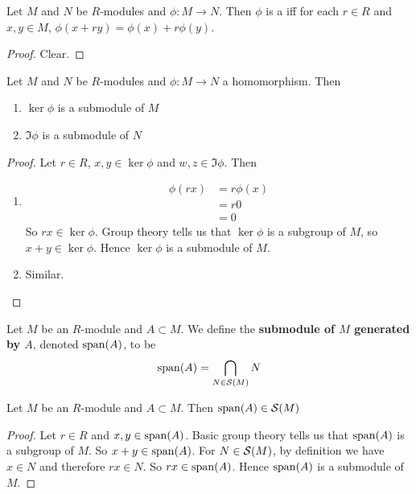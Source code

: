 \documentclass{book}
\begin{document}
	\begin{ex}
		Let $M$ and $N$ be $R$-modules and $\phi:M \rightarrow N$. Then $\phi$ is a  iff for each $r \in R$ and $x,y \in M$, $\phi(x+ry) = \phi(x) + r \phi(y)$.
	\end{ex}
	
	\begin{proof}
		Clear.
	\end{proof}
	
	\begin{ex}
		Let $M$ and $N$ be $R$-modules and $\phi:M \rightarrow N$ a homomorphism. Then 
		\begin{enumerate}
			\item $\ker \phi$ is a submodule of $M$
			\item $ \Im \phi$ is a submodule of $N$ 
		\end{enumerate}
	\end{ex}
	
	\begin{proof}
		Let $r \in R$, $x,y \in \ker \phi$ and $w,z \in \Im \phi$. Then 
		\begin{enumerate}
			\item 
			\begin{align*}
				\phi(rx) 
				&= r\phi(x) \\
				&=r 0 \\
				&= 0
			\end{align*}	
			So $rx \in \ker \phi$. Group theory tells us that $\ker \phi$ is a subgroup of $M$, so $x+y \in \ker \phi$. Hence $\ker \phi$ is a submodule of $M$. 
			\item Similar.
		\end{enumerate}
	\end{proof}
	
	\begin{defn}
		Let $M$ be an $R$-module and $A \subset M$. We define the \textbf{submodule of $M$ generated by $A$}, denoted $\operatorname{span}(A)$, to be $$\operatorname{span}(A) = \bigcap_{N \in \mathcal{S}(M)} N$$ 
	\end{defn}
	
	\begin{ex}
		Let $M$ be an $R$-module and $A \subset M$. Then 
		$\operatorname{span}(A) \in \mathcal{S}(M)$
	\end{ex}
	
	\begin{proof}
		Let $r \in R$ and $x,y \in \operatorname{span}(A)$. Basic group theory tells us that $\operatorname{span}(A)$ is a subgroup of $M$. So $x+y \in \operatorname{span}(A)$. For $N \in \mathcal{S}(M)$, by definition we have $x \in N$ and therefore $rx \in N$. So $rx \in \operatorname{span}(A)$. Hence $\operatorname{span}(A)$ is a submodule of $M$.
	\end{proof}
	
\end{document}
